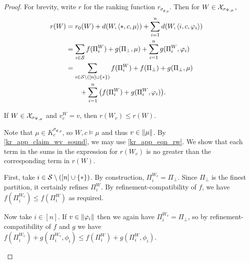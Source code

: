 \begin{proof}
    For brevity, write $r$ for the ranking function $r_{\sigma_{\Psi, \mu}}$.
    Then for $W \in \mathcal{X}_{\sigma_{\Psi, \mu}}$,
    \begin{align}
        r(W)
        &= r_0(W)
            + d(W, \langle {\ast, c, \mu} \rangle)
            + \sum_{i=1}^{n}{d(W, \langle {i, c, \varphi_i} \rangle)} \nonumber \\
        &= \sum_{i \in \mathcal{S}}{f(\Pi^W_i)}
            + g(\Pi_\bot, \mu)
            + \sum_{i=1}^{n}{g(\Pi^W_i, \varphi_i)} \nonumber \\
        &= \sum_{i \in \mathcal{S} \setminus ([n] \cup \{\ast\})}{f(\Pi^W_i)}
            + f(\Pi_\bot)
            + g(\Pi_\bot, \mu) \nonumber \\
            &\quad\quad + \sum_{i=1}^{n}{
               \left(
                    f(\Pi^W_i) + g(\Pi^W_i, \varphi_i)
               \right)
            }.
            \label{kr_app_eqn_rw}
    \end{align}

    \begin{claim}
        \label{kr_app_claim_rv_better_than_w}
        If $W \in \mathcal{X}_{\sigma_{\Psi, \mu}}$ and $v^W_c = v$, then $r(W_v) \le
        r(W)$.
    \end{claim}
    \begin{claimproof}
        Note that $\mu \in K^{\sigma_{\Psi, \mu}}_c$, so $W, c \models \mu$ and
        thus $v \in \|{\mu}\|$. By \cref{kr_app_claim_wv_sound}, we may
        use \cref{kr_app_eqn_rw}.  We show that each term in the sums in the
        expression for $r(W_v)$ is no greater than the corresponding term in
        $r(W)$.

        First, take $i \in \mathcal{S} \setminus ([n] \cup \{\ast\})$. By
        construction, $\Pi^{W_v}_i = \Pi_\bot$. Since $\Pi_\bot$ is the finest
        partition, it certainly refines $\Pi^W_i$. By refinement-compatibility
        of $f$, we have $f(\Pi^{W_v}_i) \le f(\Pi^W_i)$ as required.

        Now take $i \in [n]$. If $v \in \|{\varphi_i}\|$ then we again have
        $\Pi^{W_v}_i = \Pi_\bot$, so by refinement-compatibility of $f$ and $g$
        we have $f(\Pi^{W_v}_i) + g(\Pi^{W_v}_i, \phi_i) \le f(\Pi^W_i) +
        g(\Pi^W_i, \phi_i)$.


\end{claimproof}
\end{proof}
